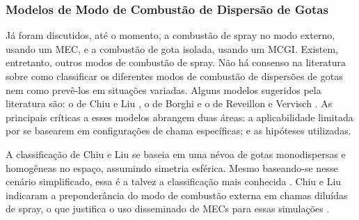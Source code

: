 \subsubsection{Modelos de Modo de Combustão de Dispersão de Gotas}

Já foram discutidos, até o momento, a combustão de spray no modo externo, usando um MEC, e a combustão de gota isolada, usando um MCGI.
Existem, entretanto, outros modos de combustão de spray.
Não há consenso na literatura sobre como classificar os diferentes modos de combustão de dispersões de gotas nem como prevê-los em situações variadas.
Alguns modelos sugeridos pela literatura são: o de Chiu e Liu \cite{ChiuH1977,ChiuH1982}, o de Borghi \cite{Borghi1996} e o de Reveillon e Vervisch \cite{ReveillonJ2005}.
As principais críticas a esses modelos abrangem duas áreas: a aplicabilidade limitada por se basearem em configurações de chama específicas; e as hipóteses utilizadas. 

A classificação de Chiu e Liu \cite{ChiuH1977,ChiuH1982} se baseia em uma névoa de gotas monodispersas e homogêneas no espaço, assumindo simetria esférica.
Mesmo baseando-se nesse cenário simplificado, essa é a talvez a classificação mais conhecida \cite{JennyB2012}.
Chiu e Liu \cite{ChiuH1982} indicaram a preponderância do modo de combustão externa em chamas diluídas de spray, o que justifica o uso disseminado de MECs para essas simulações \cite{SacomanoF2017PhD}.



